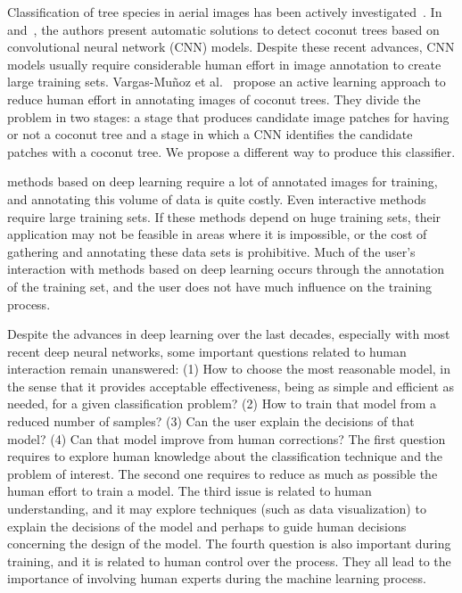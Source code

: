 \documentclass[a4paper,conference]{IEEEtran}
\begin{document}
Classification of tree species in aerial images has been actively investigated~\cite{fassnacht2016review}. In \cite{puttemans2018comparing} and~\cite{aparna2018cnn}, the authors present automatic solutions to detect coconut trees based on convolutional neural network (CNN) models. Despite these recent advances, CNN models usually require considerable human effort in image annotation to create large training sets. Vargas-Muñoz et al.~\cite{8899005}  propose an active learning approach to reduce human effort in annotating images of coconut trees. They divide the problem in two stages: a stage that produces candidate image patches for having or not a coconut tree and a stage in which a CNN identifies the candidate patches with a coconut tree. We propose a different way to produce this classifier.  

methods based on deep learning require a lot of annotated images for training, and annotating this volume of data is quite costly. Even interactive methods require large training sets. If these methods depend on huge training sets, their application may not be feasible in areas where it is impossible, or the cost of gathering and annotating these data sets is prohibitive. Much of the user's interaction with methods based on deep learning occurs through the annotation of the training set, and the user does not have much influence on the training process.






Despite the advances in deep learning over the last decades, especially with most recent deep neural networks, some important questions related to human interaction remain unanswered: (1) How to choose the most reasonable model, in the sense that it provides acceptable effectiveness, being as simple and efficient as needed, for a given classification problem? (2) How to train that model from a reduced number of samples?  (3) Can the user explain the decisions of that model? (4) Can that model improve from human corrections? The first question requires to explore human knowledge about the classification technique and the problem of interest. The second one requires to reduce as much as possible the human effort to train a model. The third issue is related to human understanding, and it may explore techniques (such as data visualization) to explain the decisions of the model and perhaps to guide human decisions concerning the design of the model. The fourth question is also important during training, and it is related to human control over the process. They all lead to the importance of involving human experts during the machine learning process.
\end{document}
